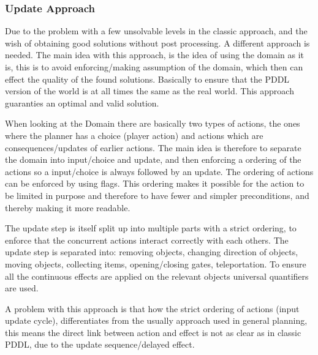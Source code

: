		\subsubsection{Update Approach}
		Due to the problem with a few unsolvable levels in the classic approach, and the wish of obtaining good solutions without post processing. A different approach is needed. The main idea with this approach, is the idea of using the domain as it is, this is to avoid enforcing/making assumption of the domain, which then can effect the quality of the found solutions. Basically to ensure that the PDDL version of the world is at all times the same as the real world. This approach guaranties an optimal and valid solution.
		
		When looking at the Domain there are basically two types of actions, the ones where the planner has a choice (player action) and actions which are consequences/updates of earlier actions. The main idea is therefore to separate the domain into input/choice and update, and then enforcing a ordering of the actions so a input/choice is always followed by an update. The ordering of actions can be enforced by using flags.	This ordering makes it possible for the action to be limited in purpose and therefore to have fewer and simpler preconditions, and thereby making it more readable.
		
		The update step is itself split up into multiple parts with a strict ordering, to enforce that the concurrent actions interact correctly with each others. The update step is separated into: removing objects, changing direction of objects, moving objects, collecting items, opening/closing gates, teleportation. To ensure all the continuous effects are applied on the relevant objects universal quantifiers are used. 
		
		A problem with this approach is that how the strict ordering of actions (input update cycle), differentiates from the usually approach used in general planning, this means the direct link between action and effect is not as clear as in classic PDDL, due to the update sequence/delayed effect. 
		
	

	
	

